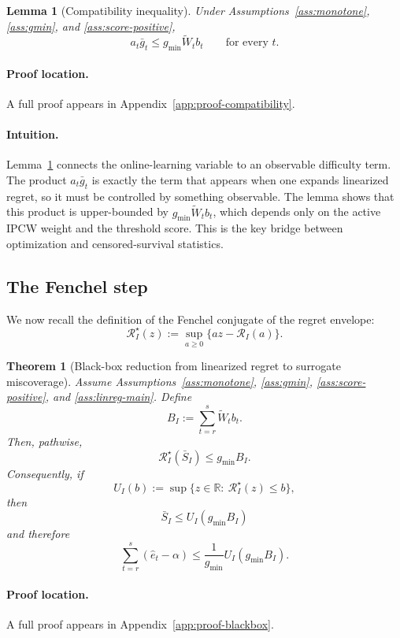 \documentclass[11pt]{article}
\newtheorem{theorem}{Theorem}
\newtheorem{lemma}{Lemma}
\newcommand{\R}{\mathbb{R}}
\newcommand{\1}{\mathbf{1}}
\begin{document}
\begin{lemma}[Compatibility inequality]
\label{lem:compatibility}
Under Assumptions~\ref{ass:monotone}, \ref{ass:gmin}, and \ref{ass:score-positive},
\[
a_t\bar g_t\le g_{\min}\widetilde W_t b_t
\qquad\text{for every }t.
\]
\end{lemma}

\paragraph{Proof location.} A full proof appears in Appendix~\ref{app:proof-compatibility}.


\paragraph{Intuition.} Lemma~\ref{lem:compatibility} connects the online-learning variable to an observable difficulty term. The product $a_t\bar g_t$ is exactly the term that appears when one expands linearized regret, so it must be controlled by something observable. The lemma shows that this product is upper-bounded by $g_{\min}\widetilde W_t b_t$, which depends only on the active IPCW weight and the threshold score. This is the key bridge between optimization and censored-survival statistics.


\subsection{The Fenchel step}

We now recall the definition of the Fenchel conjugate of the regret envelope:
\[
\mathcal R_I^\star(z):=\sup_{a\ge 0}\{az-\mathcal R_I(a)\}.
\]

\begin{theorem}[Black-box reduction from linearized regret to surrogate miscoverage]
\label{thm:blackbox}
Assume Assumptions~\ref{ass:monotone}, \ref{ass:gmin}, \ref{ass:score-positive}, and \ref{ass:linreg-main}. Define
\[
B_I:=\sum_{t=r}^s \widetilde W_t b_t.
\]
Then, pathwise,
\[
\mathcal R_I^\star(\bar S_I)\le g_{\min}B_I.
\]
Consequently, if
\[
U_I(b):=\sup\{z\in\R:\ \mathcal R_I^\star(z)\le b\},
\]
then
\[
\bar S_I\le U_I(g_{\min}B_I)
\]
and therefore
\[
\sum_{t=r}^s(\hat e_t-\alpha)
\le
\frac{1}{g_{\min}}U_I(g_{\min}B_I).
\]
\end{theorem}

\paragraph{Proof location.} A full proof appears in Appendix~\ref{app:proof-blackbox}.
\end{document}
